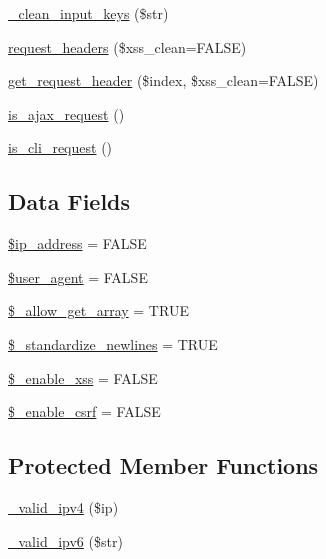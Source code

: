 \begin{DoxyCompactItemize}
\item 
\hyperlink{class_c_i___input_af42e370cfe61ee5a34b72cf37b919210}{\-\_\-clean\-\_\-input\-\_\-keys} (\$str)
\item 
\hyperlink{class_c_i___input_a4bc8f8c9a9488ff359a61f1fb60e6097}{request\-\_\-headers} (\$xss\-\_\-clean=F\-A\-L\-S\-E)
\item 
\hyperlink{class_c_i___input_a099af71b54f9edbfb20576a4e8a3df41}{get\-\_\-request\-\_\-header} (\$index, \$xss\-\_\-clean=F\-A\-L\-S\-E)
\item 
\hyperlink{class_c_i___input_a4ae07120b0b2ace90eb2f7ec72b29426}{is\-\_\-ajax\-\_\-request} ()
\item 
\hyperlink{class_c_i___input_a70c1e8a081ef955c1a52164634d4f66e}{is\-\_\-cli\-\_\-request} ()
\end{DoxyCompactItemize}
\subsection*{Data Fields}
\begin{DoxyCompactItemize}
\item 
\hyperlink{class_c_i___input_a614e10d1ab6dcf06fa7fef37af7b7eee}{\$ip\-\_\-address} = F\-A\-L\-S\-E
\item 
\hyperlink{class_c_i___input_aeea73d2dc27fea041fbcadae59f07cd5}{\$user\-\_\-agent} = F\-A\-L\-S\-E
\item 
\hyperlink{class_c_i___input_a359b1debb6f1d80e345d6215af6946fb}{\$\-\_\-allow\-\_\-get\-\_\-array} = T\-R\-U\-E
\item 
\hyperlink{class_c_i___input_ad9ebdfce8f992b3a41aaf64ea8782933}{\$\-\_\-standardize\-\_\-newlines} = T\-R\-U\-E
\item 
\hyperlink{class_c_i___input_a42b707bea5d9604a7460e953d9e39d7d}{\$\-\_\-enable\-\_\-xss} = F\-A\-L\-S\-E
\item 
\hyperlink{class_c_i___input_a463c89c07e7cf7f5e4337a2a8e460d17}{\$\-\_\-enable\-\_\-csrf} = F\-A\-L\-S\-E
\end{DoxyCompactItemize}
\subsection*{Protected Member Functions}
\begin{DoxyCompactItemize}
\item 
\hyperlink{class_c_i___input_acc1814d63877524ba3434eca5453edf0}{\-\_\-valid\-\_\-ipv4} (\$ip)
\item 
\hyperlink{class_c_i___input_a25d7802ebfe7e908ea45310013a24723}{\-\_\-valid\-\_\-ipv6} (\$str)
\end{DoxyCompactItemize}
